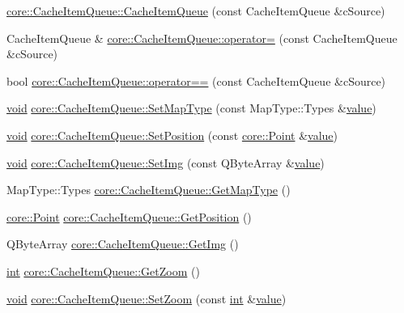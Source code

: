 \begin{DoxyCompactItemize}
\hyperlink{group___o_p_map_widget_ga3dce0468e367c4fc113ecf651b691a9f}{core\-::\-Cache\-Item\-Queue\-::\-Cache\-Item\-Queue} (const Cache\-Item\-Queue \&c\-Source)
\item 
Cache\-Item\-Queue \& \hyperlink{group___o_p_map_widget_gae7e315a2dbbb005c92e8d39d4e189d75}{core\-::\-Cache\-Item\-Queue\-::operator=} (const Cache\-Item\-Queue \&c\-Source)
\item 
bool \hyperlink{group___o_p_map_widget_ga18cc75c132d29a3dde534259ffe74e0e}{core\-::\-Cache\-Item\-Queue\-::operator==} (const Cache\-Item\-Queue \&c\-Source)
\item 
\hyperlink{group___u_a_v_objects_plugin_ga444cf2ff3f0ecbe028adce838d373f5c}{void} \hyperlink{group___o_p_map_widget_ga182224d6a020047e69c16ce20adb25bd}{core\-::\-Cache\-Item\-Queue\-::\-Set\-Map\-Type} (const Map\-Type\-::\-Types \&\hyperlink{glext_8h_aa0e2e9cea7f208d28acda0480144beb0}{value})
\item 
\hyperlink{group___u_a_v_objects_plugin_ga444cf2ff3f0ecbe028adce838d373f5c}{void} \hyperlink{group___o_p_map_widget_ga085e1a1de0ae2d6b9d8c6786f922c6a7}{core\-::\-Cache\-Item\-Queue\-::\-Set\-Position} (const \hyperlink{structcore_1_1_point}{core\-::\-Point} \&\hyperlink{glext_8h_aa0e2e9cea7f208d28acda0480144beb0}{value})
\item 
\hyperlink{group___u_a_v_objects_plugin_ga444cf2ff3f0ecbe028adce838d373f5c}{void} \hyperlink{group___o_p_map_widget_gaf1ff6340158da1ba5139ba7c442758cd}{core\-::\-Cache\-Item\-Queue\-::\-Set\-Img} (const Q\-Byte\-Array \&\hyperlink{glext_8h_aa0e2e9cea7f208d28acda0480144beb0}{value})
\item 
Map\-Type\-::\-Types \hyperlink{group___o_p_map_widget_gac72aa0d2725fa7a43d69620e086eb6b4}{core\-::\-Cache\-Item\-Queue\-::\-Get\-Map\-Type} ()
\item 
\hyperlink{structcore_1_1_point}{core\-::\-Point} \hyperlink{group___o_p_map_widget_ga1fa7cca0baacf348206a3f015041f07b}{core\-::\-Cache\-Item\-Queue\-::\-Get\-Position} ()
\item 
Q\-Byte\-Array \hyperlink{group___o_p_map_widget_ga6a02a2e0a6cefcd82c2fad88dcdbd89e}{core\-::\-Cache\-Item\-Queue\-::\-Get\-Img} ()
\item 
\hyperlink{ioapi_8h_a787fa3cf048117ba7123753c1e74fcd6}{int} \hyperlink{group___o_p_map_widget_gadfe7e49ddc244b2d8b26f9087d954f7d}{core\-::\-Cache\-Item\-Queue\-::\-Get\-Zoom} ()
\item 
\hyperlink{group___u_a_v_objects_plugin_ga444cf2ff3f0ecbe028adce838d373f5c}{void} \hyperlink{group___o_p_map_widget_ga0780a9a7876dc6fbb7aa3bc7b5465956}{core\-::\-Cache\-Item\-Queue\-::\-Set\-Zoom} (const \hyperlink{ioapi_8h_a787fa3cf048117ba7123753c1e74fcd6}{int} \&\hyperlink{glext_8h_aa0e2e9cea7f208d28acda0480144beb0}{value})

\end{DoxyCompactItemize}
